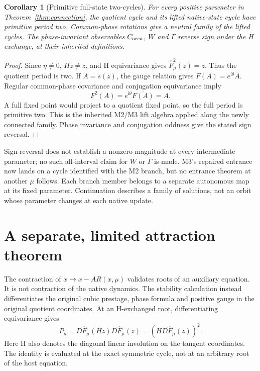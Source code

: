 \documentclass[11pt,a4paper]{article}
\numberwithin{equation}{section}
\newtheorem{corollary}[theorem]{Corollary}
\newcommand{\Fh}{\widehat F}\newcommand{\eps}{\varepsilon}
\newcommand{\iu}{\mathrm i}\newcommand{\one}{\mathbf 1}
\begin{document}
\begin{corollary}[Primitive full-state two-cycles]\label{cor:full-state}
For every positive parameter in Theorem~\ref{thm:connection}, the quotient cycle and its lifted native-state cycle have primitive period two. Common-phase rotations give a neutral family of the lifted cycles. The phase-invariant observables $C_{\rm area}$, $W$ and $\Gamma$ reverse sign under the H exchange, at their inherited definitions.
\end{corollary}
\begin{proof}
Since $\eta\ne0$, $Hz\ne z$, and H equivariance gives $\Fh_\mu^2(z)=z$. Thus the quotient period is two. If $A=s(z)$, the gauge relation gives $F(A)=e^{\iu\theta}\overline A$. Regular common-phase covariance and conjugation equivariance imply
\begin{equation}
F^2(A)=e^{\iu\theta}\overline{F(A)}=A.\label{eq:full-lift}
\end{equation}
A full fixed point would project to a quotient fixed point, so the full period is primitive two. This is the inherited M2/M3 lift algebra applied along the newly connected family. Phase invariance and conjugation oddness give the stated sign reversal.
\end{proof}

Sign reversal does not establish a nonzero magnitude at every intermediate parameter; no such all-interval claim for $W$ or $\Gamma$ is made. M3's repaired entrance now lands on a cycle identified with the M2 branch, but no entrance theorem at another $\mu$ follows. Each branch member belongs to a separate autonomous map at its fixed parameter. Continuation describes a family of solutions, not an orbit whose parameter changes at each native update.

\section{A separate, limited attraction theorem}\label{sec:stability}
The contraction of $x\mapsto x-A R(x,\mu)$ validates roots of an auxiliary equation. It is not contraction of the native dynamics. The stability calculation instead differentiates the original cubic prestage, phase formula and positive gauge in the original quotient coordinates. At an H-exchanged root, differentiating equivariance gives
\begin{equation}
P_\mu=D\Fh_\mu(Hz)D\Fh_\mu(z)
      =(H D\Fh_\mu(z))^2.\label{eq:two-step}
\end{equation}
Here H also denotes the diagonal linear involution on the tangent coordinates. The identity is evaluated at the exact symmetric cycle, not at an arbitrary root of the host equation.
\end{document}
